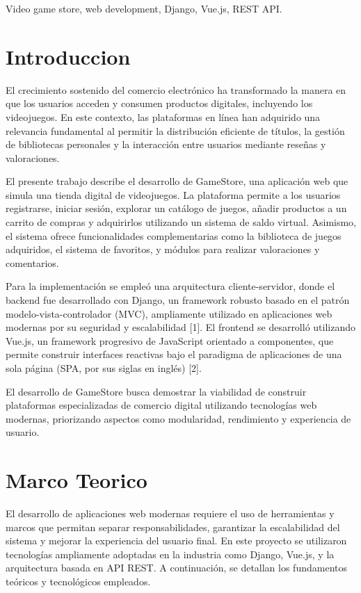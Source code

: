 \documentclass[conference]{IEEEtran}
\begin{document}
\begin{IEEEkeywords}
Video game store, web development, Django, Vue.js, REST API.
\end{IEEEkeywords}

\section{Introduccion}
El crecimiento sostenido del comercio electrónico ha transformado la manera en que los usuarios acceden y consumen productos digitales, incluyendo los videojuegos. En este contexto, las plataformas en línea han adquirido una relevancia fundamental al permitir la distribución eficiente de títulos, la gestión de bibliotecas personales y la interacción entre usuarios mediante reseñas y valoraciones.

El presente trabajo describe el desarrollo de GameStore, una aplicación web que simula una tienda digital de videojuegos. La plataforma permite a los usuarios registrarse, iniciar sesión, explorar un catálogo de juegos, añadir productos a un carrito de compras y adquirirlos utilizando un sistema de saldo virtual. Asimismo, el sistema ofrece funcionalidades complementarias como la biblioteca de juegos adquiridos, el sistema de favoritos, y módulos para realizar valoraciones y comentarios.

Para la implementación se empleó una arquitectura cliente-servidor, donde el backend fue desarrollado con Django, un framework robusto basado en el patrón modelo-vista-controlador (MVC), ampliamente utilizado en aplicaciones web modernas por su seguridad y escalabilidad [1]. El frontend se desarrolló utilizando Vue.js, un framework progresivo de JavaScript orientado a componentes, que permite construir interfaces reactivas bajo el paradigma de aplicaciones de una sola página (SPA, por sus siglas en inglés) [2].

El desarrollo de GameStore busca demostrar la viabilidad de construir plataformas especializadas de comercio digital utilizando tecnologías web modernas, priorizando aspectos como modularidad, rendimiento y experiencia de usuario.
 
\section{Marco Teorico}
El desarrollo de aplicaciones web modernas requiere el uso de herramientas y marcos que permitan separar responsabilidades, garantizar la escalabilidad del sistema y mejorar la experiencia del usuario final. En este proyecto se utilizaron tecnologías ampliamente adoptadas en la industria como Django, Vue.js, y la arquitectura basada en API REST. A continuación, se detallan los fundamentos teóricos y tecnológicos empleados.
\end{document}
